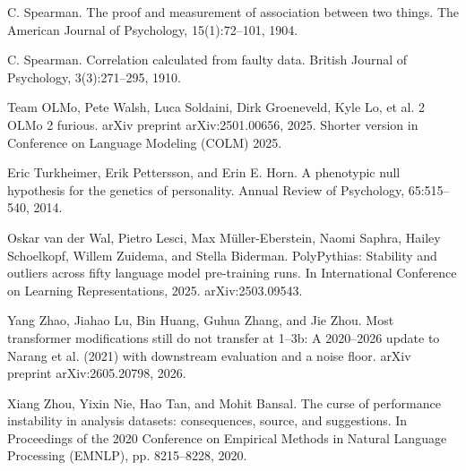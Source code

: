 \noindent C. Spearman. The proof and measurement of association between two things. The American Journal of Psychology, 15(1):72--101, 1904.\par\medskip

\noindent C. Spearman. Correlation calculated from faulty data. British Journal of Psychology, 3(3):271--295, 1910.\par\medskip

\noindent Team OLMo, Pete Walsh, Luca Soldaini, Dirk Groeneveld, Kyle Lo, et al. 2 OLMo 2 furious. arXiv preprint arXiv:2501.00656, 2025. Shorter version in Conference on Language Modeling (COLM) 2025.\par\medskip

\noindent Eric Turkheimer, Erik Pettersson, and Erin E. Horn. A phenotypic null hypothesis for the genetics of personality. Annual Review of Psychology, 65:515--540, 2014.\par\medskip

\noindent Oskar van der Wal, Pietro Lesci, Max M\"{u}ller-Eberstein, Naomi Saphra, Hailey Schoelkopf, Willem Zuidema, and Stella Biderman. PolyPythias: Stability and outliers across fifty language model pre-training runs. In International Conference on Learning Representations, 2025. arXiv:2503.09543.\par\medskip

\noindent Yang Zhao, Jiahao Lu, Bin Huang, Guhua Zhang, and Jie Zhou. Most transformer modifications still do not transfer at 1--3b: A 2020--2026 update to Narang et al. (2021) with downstream evaluation and a noise floor. arXiv preprint arXiv:2605.20798, 2026.\par\medskip

\noindent Xiang Zhou, Yixin Nie, Hao Tan, and Mohit Bansal. The curse of performance instability in analysis datasets: consequences, source, and suggestions. In Proceedings of the 2020 Conference on Empirical Methods in Natural Language Processing (EMNLP), pp. 8215--8228, 2020.\par\medskip
